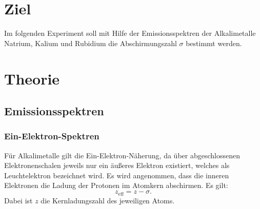 \section{Ziel}
\label{sec:ziel}

Im folgenden Experiment soll mit Hilfe der Emissionsspektren der Alkalimetalle Natrium, Kalium und Rubidium die Abschirmungszahl $\sigma$ bestimmt werden.

\section{Theorie}
\label{sec:theorie}

\subsection{Emissionsspektren}
\subsubsection{Ein-Elektron-Spektren}
Für Alkalimetalle gilt die Ein-Elektron-Näherung, da über abgeschlossenen Elektronenschalen jeweils nur ein äußeres Elektron existiert, welches als Leuchtelektron bezeichnet wird. Es wird angenommen, dass die inneren Elektronen die Ladung der Protonen im Atomkern abschirmen. Es gilt:
\begin{equation}
  z_\mathrm{eff} = z-\sigma.
\end{equation}
Dabei ist $z$ die Kernladungszahl des jeweiligen Atoms.

